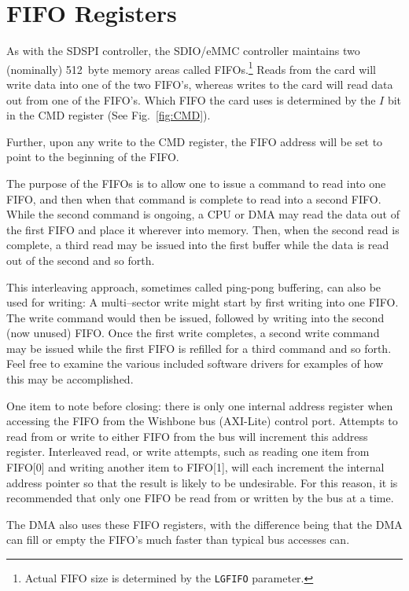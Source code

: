\documentclass{gqtekspec}
\begin{document}
\section{FIFO Registers}	%
As with the SDSPI controller, the SDIO/eMMC controller maintains two (nominally)
512~byte memory areas called FIFOs.\footnote{Actual FIFO size is determined
by the {\tt LGFIFO} parameter.}  Reads from the card will write data into one
of the two FIFO's, whereas writes to the card will read data out from one of
the FIFO's.  Which FIFO the card uses is determined by the $I$ bit in the CMD
register (See Fig.~\ref{fig:CMD}).

Further, upon any write to the CMD register, the FIFO address will be set
to point to the beginning of the FIFO.

The purpose of the FIFOs is to allow one to issue a command to read into one
FIFO, and then when that command is complete to read into a second FIFO.  While
the second command is ongoing, a CPU or DMA may read the data out of the first
FIFO and place it wherever into memory.  Then, when the second read is complete,
a third read may be issued into the first buffer while the data is read out of
the second and so forth.

This interleaving approach, sometimes called ping-pong buffering, can also be
used for writing: A multi--sector write might start by first writing into one
FIFO.  The write command would then be issued, followed by writing into the
second (now unused) FIFO.  Once the first write completes, a second write
command may be issued while the first FIFO is refilled for a third command
and so forth.  Feel free to examine the various included software drivers for
examples of how this may be accomplished.

One item to note before closing: there is only one internal address register
when accessing the FIFO from the Wishbone bus (AXI-Lite) control port.  Attempts
to read from or write to either FIFO from the bus will increment this address 
register.  Interleaved read, or write attempts, such as reading one item from
FIFO[0] and writing another item to FIFO[1], will each increment the internal
address pointer so that the result is likely to be undesirable.  For this
reason, it is recommended that only one FIFO be read from or written by the
bus at a time.

The DMA also uses these FIFO registers, with the difference being that the DMA
can fill or empty the FIFO's much faster than typical bus accesses can.
\end{document}
